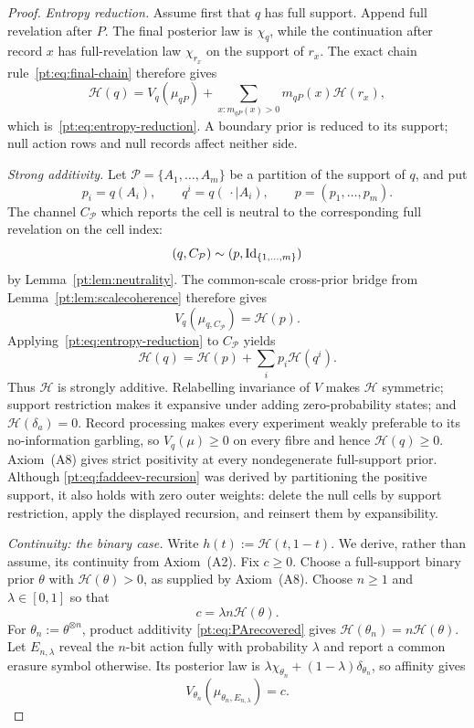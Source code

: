 \begin{proof}
\emph{Entropy reduction.}
Assume first that $q$ has full support.  Append full revelation after $P$.
The final posterior law is $\chi_q$, while the continuation after record $x$
has full-revelation law $\chi_{r_x}$ on the support of $r_x$.  The exact
chain rule~\eqref{pt:eq:final-chain} therefore gives
\[
 \mathcal H(q)=V_q(\mu_{qP})
 +\sum_{x:m_{qP}(x)>0}m_{qP}(x)\mathcal H(r_x),
\]
which is~\eqref{pt:eq:entropy-reduction}.  A boundary prior is reduced to its
support; null action rows and null records affect neither side.

\emph{Strong additivity.}
Let $\mathcal P=\{A_1,\ldots,A_m\}$ be a partition of the support of $q$,
and put
\[
 p_i=q(A_i),\qquad q^i=q(\,\cdot\mid A_i),\qquad
 p=(p_1,\ldots,p_m).
\]
The channel $C_{\mathcal P}$ which reports the cell is neutral to the
corresponding full revelation on the cell index:
\[
 (q,C_{\mathcal P})\sim(p,\operatorname{Id}_{\{1,\ldots,m\}})
\]
by Lemma~\ref{pt:lem:neutrality}.  The common-scale cross-prior bridge from
Lemma~\ref{pt:lem:scalecoherence} therefore gives
\[
 V_q(\mu_{q,C_{\mathcal P}})=\mathcal H(p).
\]
Applying~\eqref{pt:eq:entropy-reduction} to $C_{\mathcal P}$ yields
\begin{equation}
 \mathcal H(q)=\mathcal H(p)+\sum_i p_i\mathcal H(q^i).
\tag{FA}\label{pt:eq:faddeev-recursion}
\end{equation}
Thus $\mathcal H$ is strongly additive.  Relabelling invariance of $V$ makes
$\mathcal H$ symmetric; support restriction makes it expansive under adding
zero-probability states; and $\mathcal H(\delta_a)=0$.  Record processing
makes every experiment weakly preferable to its no-information garbling, so
$V_q(\mu)\ge0$ on every fibre and hence $\mathcal H(q)\ge0$.
Axiom~\textup{(A8)} gives strict
positivity at every nondegenerate full-support prior.
Although \eqref{pt:eq:faddeev-recursion} was derived by partitioning the
positive support, it also holds with zero outer weights: delete the null cells
by support restriction, apply the displayed recursion, and reinsert them by
expansibility.

\emph{Continuity: the binary case.}
Write $h(t):=\mathcal H(t,1-t)$.  We derive, rather than assume, its
continuity from Axiom~\textup{(A2)}.  Fix $c\ge0$.  Choose a full-support
binary prior $\theta$ with $\mathcal H(\theta)>0$, as supplied by
Axiom~\textup{(A8)}.  Choose $n\ge1$ and $\lambda\in[0,1]$ so that
\[
 c=\lambda n\mathcal H(\theta).
\]
For $\theta_n:=\theta^{\otimes n}$, product additivity
\eqref{pt:eq:PArecovered} gives
$\mathcal H(\theta_n)=n\mathcal H(\theta)$.  Let $E_{n,\lambda}$ reveal the
$n$-bit action fully with probability $\lambda$ and report a common erasure
symbol otherwise.  Its posterior law is
$\lambda\chi_{\theta_n}+(1-\lambda)\delta_{\theta_n}$, so affinity gives
\[
 V_{\theta_n}(\mu_{\theta_n,E_{n,\lambda}})=c.
\]


\end{proof}
